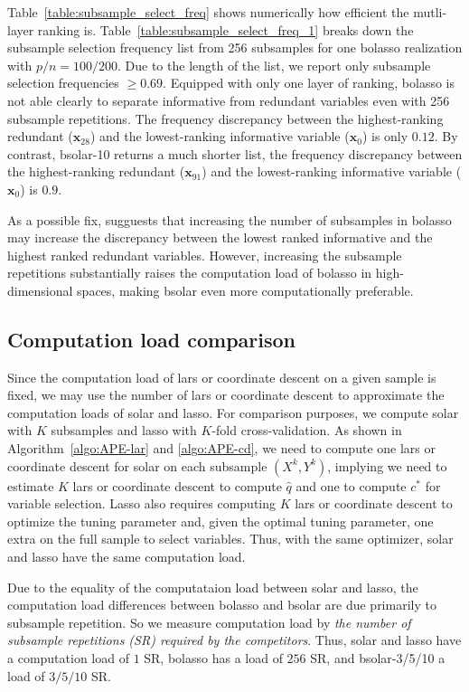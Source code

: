 \documentclass[11pt,review,authoryear]{elsarticle}
\begin{document}
Table~\ref{table:subsample_select_freq} shows numerically how efficient the mutli-layer ranking is. Table~\ref{table:subsample_select_freq_1} breaks down the subsample selection frequency list from 256 subsamples for one bolasso realization with $p/n=100/200$. Due to the length of the list, we report only subsample selection frequencies $\ge0.69$. Equipped with only one layer of ranking, bolasso is not able clearly to separate informative from redundant variables even with 256 subsample repetitions. The frequency discrepancy between the highest-ranking redundant ($\mathbf{x}_{28}$) and the lowest-ranking informative variable ($\mathbf{x}_0$) is only $0.12$. By contrast, bsolar-10 returns a much shorter list, the frequency discrepancy between the highest-ranking redundant ($\mathbf{x}_{91}$) and the lowest-ranking informative variable ($\mathbf{x}_0$) is $0.9$.

As a possible fix, \citet{bach2008bolasso} sugguests that increasing the number of subsamples in bolasso may increase the discrepancy between the lowest ranked informative and the highest ranked redundant variables. However, increasing the subsample repetitions substantially raises the computation load of bolasso in high-dimensional spaces, making bsolar even more computationally preferable.

\subsection{Computation load comparison \label{subsection:comp}}

Since the computation load of lars or coordinate descent on a given sample is fixed, we may use the number of lars or coordinate descent to approximate the computation loads of solar and lasso. For comparison purposes, we compute solar with $K$ subsamples and lasso with $K$-fold cross-validation. As shown in Algorithm~\ref{algo:APE-lar} and \ref{algo:APE-cd}, we need to compute one lars or coordinate descent for solar on each subsample $(X^k, Y^k)$, implying we need to estimate $K$ lars or coordinate descent to compute $\widehat{q}$ and one to compute $c^*$ for variable selection. Lasso also requires computing $K$ lars or coordinate descent to optimize the tuning parameter and, given the optimal tuning parameter, one extra on the full sample to select variables. Thus, with the same optimizer, solar and lasso have the same computation load.

Due to the equality of the computataion load between solar and lasso, the computation load differences between bolasso and bsolar are due primarily to subsample repetition. So we measure computation load by \emph{the number of subsample repetitions (SR) required by the competitors}. Thus, solar and lasso have a computation load of $1$ SR, bolasso has a load of $256$ SR, and bsolar-3/5/10 a load of $3/5/10$ SR.
\end{document}
